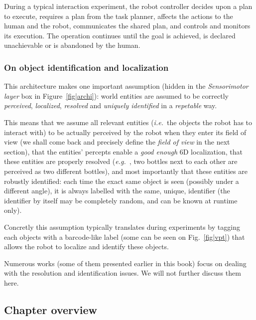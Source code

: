\documentclass{svmult}
\newcommand{\ie}{{\textit{i.e.~}}}
\newcommand{\eg}{{\textit{e.g.~}}}
\begin{document}
During a typical interaction experiment, the robot controller decides upon a
plan to execute, requires a plan from the task planner, affects the actions to
the human and the robot, communicates the shared plan, and controls and
monitors its execution. The operation continues until the goal is achieved, is
declared unachievable or is abandoned by the human.



\subsubsection*{On object identification and localization}

This architecture makes one important assumption (hidden in the
\emph{Sensorimotor layer} box in Figure~\ref{fig|archi}): world entities are
assumed to be correctly \emph{perceived}, \emph{localized}, \emph{resolved} and
\emph{uniquely identified} in a \emph{repetable} way.

This means that we assume all relevant entities (\ie the objects the robot has
to interact with) to be actually perceived by the robot when they enter its
field of view (we shall come back and precisely define the \emph{field of view}
in the next section), that the entities' percepts enable a \emph{good enough}
6D localization, that these entities are properly resolved (\eg, two bottles
next to each other are perceived as two different bottles), and most
importantly that these entities are robustly identified: each time the exact
same object is seen (possibly under a different angle), it is always labelled
with the same, unique, identifier (the identifier by itself may be completely
random, and can be known at runtime only).

Concretly this assumption typically translates during experiments by tagging
each objects with a barcode-like label (some can be seen on Fig.~\ref{fig|vpt})
that allows the robot to localize and identify these objects.

Numerous works  (some of them presented earlier in
this book) focus on dealing with the resolution and identification issues.  We
will not further discuss them here.



\subsection{Chapter overview}
\end{document}
